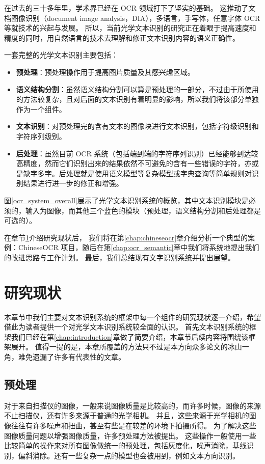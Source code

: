 在过去的三十多年里，学术界已经在 OCR 领域打下了坚实的基础。
这推动了文档图像识别（document image analysis，DIA），多语言，手写体，任意字体 OCR 等就技术的兴起与发展。
所以，当前光学文本识别的研究正在着眼于提高速度和精度的同时，用自然语言的技术去理解和修正文本识别内容的语义正确性。

一套完整的光学文本识别主要包括：

\begin{itemize}
	\item \textbf{预处理}：预处理操作用于提高图片质量及其感兴趣区域。
	\item \textbf{语义结构分割}：虽然语义结构分割可以算是预处理的一部分，不过由于所使用的方法较复杂，且对后面的文本识别有着明显的影响，所以我们将该部分单独作为一个组件。
	\item \textbf{文本识别}：对预处理完的含有文本的图像块进行文本识别，包括字符级识别和字符序列级别。
	\item \textbf{后处理}：虽然目前 OCR 系统（包括端到端的字符序列识别）已经能够到达较高精度，然而它们识别出来的结果依然不可避免的含有一些错误的字符，亦或是缺字多字。后处理就是使用语义模型等复杂模型或字典查询等简单规则对识别结果进行进一步的修正和增强。
\end{itemize}

图\ref{ocr_system_overall}展示了光学文本识别系统的概览，其中文本识别模块是必须的，输入为图像，而其他三个蓝色的模块（预处理，语义结构分割和后处理都是可选的）。

在章节\ref{chap:related_work}介绍研究现状后， 我们将在第\ref{chap:chineseocr}章介绍分析一个典型的案例：ChineseOCR 项目，随后在第\ref{chap:ocr_semantic}章中我们将系统地提出我们的改进思路与工作计划。
最后，我们总结现有文字识别系统并提出展望。

\chapter{研究现状}
\label{chap:related_work}
本章节中我们主要对文本识别系统的框架中每一个组件的研究现状逐一介绍，希望借此为读者提供一个对光学文本识别系统较全面的认识。
首先文本识别系统的框架我们已经在第\ref{chap:introduction}章做了简要介绍，本章节后续内容将围绕该框架展开。
值得一提的是，本章所覆盖的方法只不过是本方向众多论文的冰山一角，难免遗漏了许多有代表性的文章。

\section{预处理}
对于来自扫描仪的图像，一般来说图像质量是比较高的，而许多时候，图像的来源不止扫描仪，还有许多来源于普通的光学相机。
并且，这些来源于光学相机的图像往往有许多噪声和扭曲，甚至有些是在较差的环境下拍摄所得。
为了解决这些图像质量问题以增强图像质量，许多预处理方法被提出。
这些操作一般使用一些比较简单的操作来对所有图像做统一的预处理，包括灰度化，噪声消除，基线识别，偏斜消除。还有一些复杂一点的模型也会被用到，例如文本方向识别。


